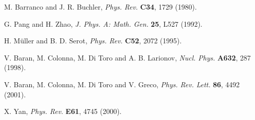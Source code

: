 \documentclass{ws-procs9x6}
\begin{document}
% 
%
%
%


\begin{thebibliography}{0}
 M. Barranco and J. R. Buchler, {\it Phys. Rev.}
{\bf C34}, 1729 (1980).

 G. Pang and H. Zhao, {\it J. Phys. A: Math. Gen.}  
{\bf 25}, L527 (1992).

 H. M\"uller and B. D. Serot, {\it Phys. Rev.} {\bf C52}, 
2072 (1995).

 V. Baran, M. Colonna, M. Di Toro and A. B. Larionov, 
{\it Nucl. Phys.} {\bf A632}, 287 (1998).

 V. Baran, M. Colonna, M. Di Toro and V. Greco, 
{\it Phys. Rev. Lett.} {\bf 86}, 4492 (2001).

 X. Yan, {\it Phys. Rev.} {\bf E61}, 4745 (2000).

\end{thebibliography}
\end{document}
